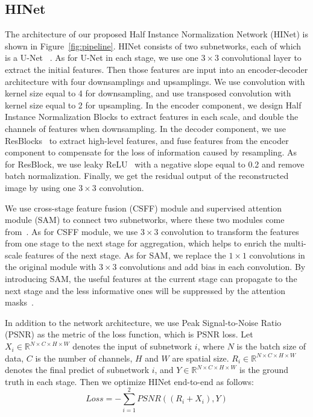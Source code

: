 \documentclass[final]{cvpr}
\begin{document}
\subsection{HINet}
\label{HINet}
The architecture of our proposed Half Instance Normalization Network (HINet) is shown in Figure~\ref{fig:pipeline}. HINet consists of two subnetworks, each of which is a U-Net ~\cite{ronneberger2015u}. 
As for U-Net in each stage, we use one $3 \times 3$ convolutional layer to extract the initial features. Then those features are input into an encoder-decoder architecture with four downsamplings and upsamplings. We use convolution with kernel size equal to 4 for downsampling, and use transposed convolution with kernel size equal to 2 for upsampling. In the encoder component, we design Half Instance Normalization Blocks to extract features in each scale, and double the channels of features when downsampling. In the decoder component, we use ResBlocks~\cite{he2016deep}  to extract high-level features, and fuse features from the encoder component to compensate for the loss of information caused by resampling. As for ResBlock, we use leaky ReLU~\cite{maas2013rectifier} with a negative slope equal to 0.2 and remove batch normalization. Finally, we get the residual output of the reconstructed image by using one $3 \times 3$ convolution.

We use cross-stage feature fusion (CSFF) module and supervised attention module (SAM) to connect two subnetworks, where these two modules come from~\cite{zamir2021multi}. As for CSFF module, we use $3 \times 3$ convolution to transform the features from one stage to the next stage for aggregation, which helps to enrich the multi-scale features of the next stage. As for SAM, we replace the $1 \times 1$ convolutions in the original module with $3 \times 3$ convolutions and add bias in each convolution. By introducing SAM, the useful features at the current stage can propagate to the next stage and the less informative ones will be suppressed by the attention masks~\cite{zamir2021multi}.

In addition to the network architecture, we use Peak Signal-to-Noise Ratio (PSNR)
as the metric of the loss function, which is PSNR loss. Let $X_i \in \mathbb{R}^{N \times C \times H \times W}$ denotes the input of subnetwork $i$, where $N$ is the batch size of data, $C$ is the number of channels, $H$ and $W$ are spatial size. $R_i \in \mathbb{R}^{N \times C \times H \times W}$ denotes the final predict of subnetwork $i$, and $Y \in \mathbb{R}^{N \times C \times H \times W}$ is the ground truth in each stage. Then we optimize HINet end-to-end as follows:
\begin{equation}
    Loss = -\sum_{i=1}^{2} PSNR((R_i + X_i), Y) \label{eq:dengshi1}
\end{equation}
\end{document}

